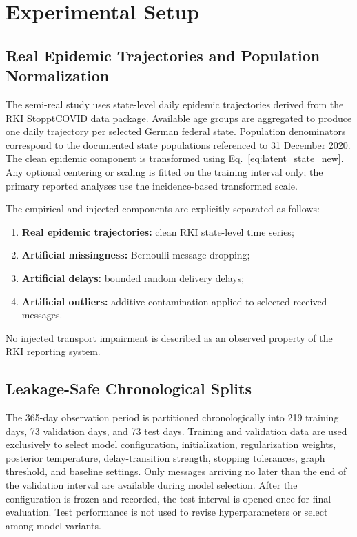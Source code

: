 \section{Experimental Setup}
\label{sec:experimental_setup}

\subsection{Real Epidemic Trajectories and Population Normalization}
\label{subsec:rki_data_new}
The semi-real study uses state-level daily epidemic trajectories derived from the RKI StopptCOVID data package. Available age groups are aggregated to produce one daily trajectory per selected German federal state. Population denominators correspond to the documented state populations referenced to 31 December 2020. The clean epidemic component is transformed using Eq.~\eqref{eq:latent_state_new}. Any optional centering or scaling is fitted on the training interval only; the primary reported analyses use the incidence-based transformed scale.

The empirical and injected components are explicitly separated as follows:
\begin{enumerate}
    \item \textbf{Real epidemic trajectories:} clean RKI state-level time series;
    \item \textbf{Artificial missingness:} Bernoulli message dropping;
    \item \textbf{Artificial delays:} bounded random delivery delays;
    \item \textbf{Artificial outliers:} additive contamination applied to selected received messages.
\end{enumerate}
No injected transport impairment is described as an observed property of the RKI reporting system.

\subsection{Leakage-Safe Chronological Splits}
\label{subsec:chronological_splits_new}
The 365-day observation period is partitioned chronologically into 219 training days, 73 validation days, and 73 test days. Training and validation data are used exclusively to select model configuration, initialization, regularization weights, posterior temperature, delay-transition strength, stopping tolerances, graph threshold, and baseline settings. Only messages arriving no later than the end of the validation interval are available during model selection. After the configuration is frozen and recorded, the test interval is opened once for final evaluation. Test performance is not used to revise hyperparameters or select among model variants.

